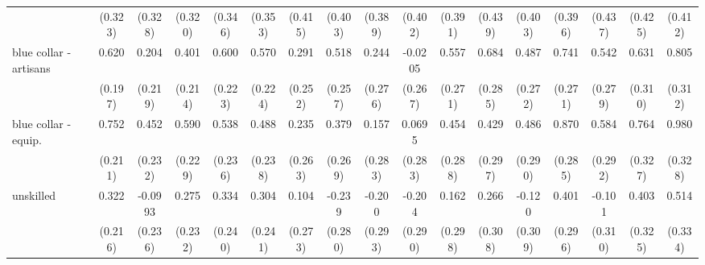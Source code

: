 {\begin{tabular}{l*{16}{c}}
                    &     (0.323)         &     (0.328)         &     (0.320)         &     (0.346)         &     (0.353)         &     (0.415)         &     (0.403)         &     (0.389)         &     (0.402)         &     (0.391)         &     (0.439)         &     (0.403)         &     (0.396)         &     (0.437)         &     (0.425)         &     (0.412)         \\
[1em]
blue collar - artisans&       0.620\sym{**} &       0.204         &       0.401         &       0.600\sym{**} &       0.570\sym{*}  &       0.291         &       0.518\sym{*}  &       0.244         &     -0.0205         &       0.557\sym{*}  &       0.684\sym{*}  &       0.487         &       0.741\sym{**} &       0.542         &       0.631\sym{*}  &       0.805\sym{**} \\
                    &     (0.197)         &     (0.219)         &     (0.214)         &     (0.223)         &     (0.224)         &     (0.252)         &     (0.257)         &     (0.276)         &     (0.267)         &     (0.271)         &     (0.285)         &     (0.272)         &     (0.271)         &     (0.279)         &     (0.310)         &     (0.312)         \\
[1em]
blue collar - equip.&       0.752\sym{***}&       0.452         &       0.590\sym{**} &       0.538\sym{*}  &       0.488\sym{*}  &       0.235         &       0.379         &       0.157         &      0.0695         &       0.454         &       0.429         &       0.486         &       0.870\sym{**} &       0.584\sym{*}  &       0.764\sym{*}  &       0.980\sym{**} \\
                    &     (0.211)         &     (0.232)         &     (0.229)         &     (0.236)         &     (0.238)         &     (0.263)         &     (0.269)         &     (0.283)         &     (0.283)         &     (0.288)         &     (0.297)         &     (0.290)         &     (0.285)         &     (0.292)         &     (0.327)         &     (0.328)         \\
[1em]
unskilled           &       0.322         &     -0.0993         &       0.275         &       0.334         &       0.304         &       0.104         &      -0.239         &      -0.200         &      -0.204         &       0.162         &       0.266         &      -0.120         &       0.401         &      -0.101         &       0.403         &       0.514         \\
                    &     (0.216)         &     (0.236)         &     (0.232)         &     (0.240)         &     (0.241)         &     (0.273)         &     (0.280)         &     (0.293)         &     (0.290)         &     (0.298)         &     (0.308)         &     (0.309)         &     (0.296)         &     (0.310)         &     (0.325)         &     (0.334)         \\

\end{tabular}}
